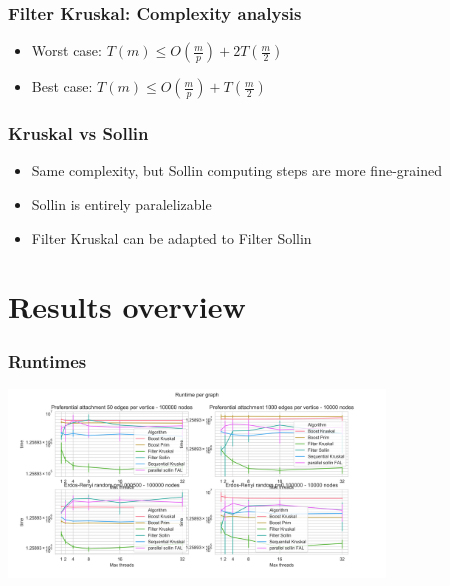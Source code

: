 \documentclass{beamer}
\begin{document}
\begin{frame}

    \frametitle{Filter Kruskal: Complexity analysis}

    \begin{itemize}
        \item Worst case:
            $T(m) \leq O\left( \frac{m}{p} \right) + 2 T\left( \frac{m}{2} \right) $
            \\
        \item Best case:
            $T(m) \leq O\left( \frac{m}{p} \right) + T\left( \frac{m}{2} \right) $
            \\
    \end{itemize}

\end{frame}

\begin{frame}
    \frametitle{Kruskal vs Sollin}
    \begin{itemize}
        \item Same complexity, but Sollin computing steps are more fine-grained
        \item Sollin is entirely paralelizable
        \item Filter Kruskal can be adapted to Filter Sollin
    \end{itemize}
\end{frame}


\section{Results overview}

\begin{frame}
\frametitle{Runtimes}
\centering
\includegraphics[width=10cm]{Graph_runtime.png}
\end{frame}
\end{document}
